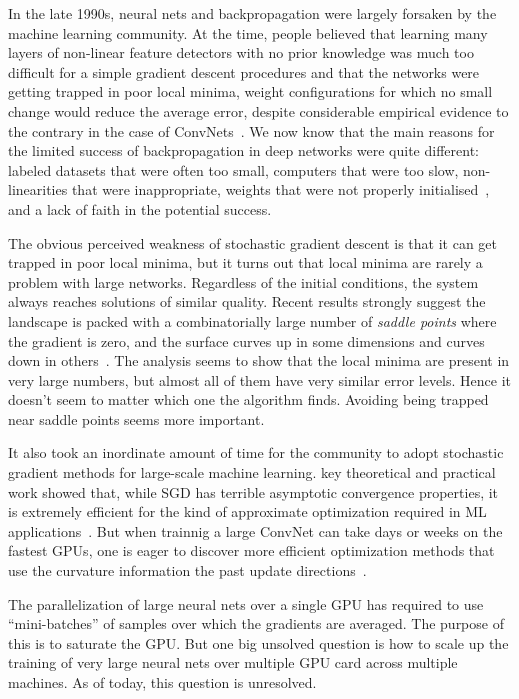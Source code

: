 \documentclass[10pts]{article}
\begin{document}
In the late 1990s, neural nets and backpropagation were largely
forsaken by the machine learning community. At the time, people
believed that learning many layers of non-linear feature detectors
with no prior knowledge was much too difficult for a simple gradient
descent procedures and that the networks were getting trapped in poor
local minima, weight configurations for which no small change would
reduce the average error, despite considerable empirical evidence to
the contrary in the case of ConvNets~\citep{lecun-98}. We now know
that the main reasons for the limited success of backpropagation in
deep networks were quite different: labeled datasets that were often
too small, computers that were too slow, non-linearities that were
inappropriate, weights that were not properly
initialised~\citep{lecun-98b,GlorotAISTATS2010-small}, and a lack of
faith in the potential success.

The obvious perceived weakness of stochastic gradient descent is that
it can get trapped in poor local minima, but it turns out that local
minima are rarely a problem with large networks. Regardless of the
initial conditions, the system always reaches solutions of similar
quality.  Recent results strongly suggest the landscape is packed with
a combinatorially large number of {\em saddle points} where the
gradient is zero, and the surface curves up in some dimensions and
curves down in
others~\citep{Dauphin-et-al-NIPS2014-small,Choromanska-et-al-AISTATS2015}.
The analysis seems to show that the local minima are present in very
large numbers, but almost all of them have very similar error levels.
Hence it doesn't seem to matter which one the algorithm
finds. Avoiding being trapped near saddle points seems more important.

It also took an inordinate amount of time for the community to adopt
stochastic gradient methods for large-scale machine learning. key
theoretical and practical work showed that, while SGD has terrible
asymptotic convergence properties, it is extremely efficient for the
kind of approximate optimization required in ML
applications~\citep{bottou-bousquet-2008-small}. But when trainnig a
large ConvNet can take days or weeks on the fastest GPUs, one is eager
to discover more efficient optimization methods that use the curvature
information the past update directions~\citep{lecun-98b,Montavon2012}.

The parallelization of large neural nets over a single GPU has
required to use ``mini-batches'' of samples over which the gradients
are averaged. The purpose of this is to saturate the GPU. But one big
unsolved question is how to scale up the training of very large neural
nets over multiple GPU card across multiple machines. As of today, this
question is unresolved.
\end{document}
